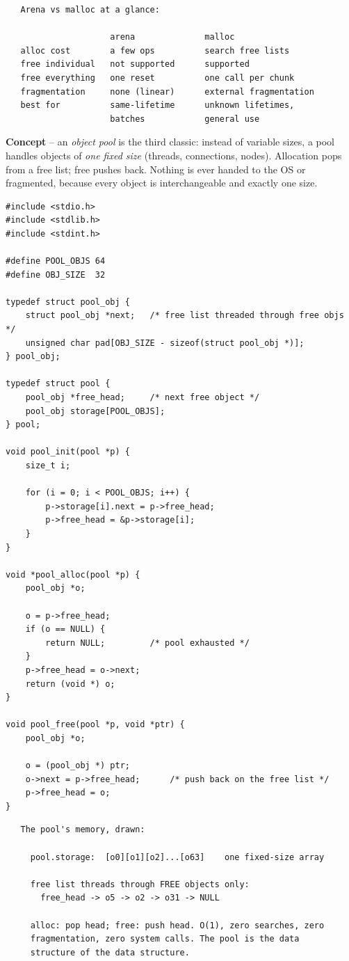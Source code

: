 \begin{verbatim}
   Arena vs malloc at a glance:

                     arena              malloc
   alloc cost        a few ops          search free lists
   free individual   not supported      supported
   free everything   one reset          one call per chunk
   fragmentation     none (linear)      external fragmentation
   best for          same-lifetime      unknown lifetimes,
                     batches            general use
\end{verbatim}

\textbf{Concept} -- an \emph{object pool} is the third classic: instead
of variable sizes, a pool handles objects of \emph{one fixed size}
(threads, connections, nodes). Allocation pops from a free list;
free pushes back. Nothing is ever handed to the OS or fragmented,
because every object is interchangeable and exactly one size.

\begin{lstlisting}[caption={An object pool: fixed-size objects, no fragmentation.}]
#include <stdio.h>
#include <stdlib.h>
#include <stdint.h>

#define POOL_OBJS 64
#define OBJ_SIZE  32

typedef struct pool_obj {
    struct pool_obj *next;   /* free list threaded through free objs */
    unsigned char pad[OBJ_SIZE - sizeof(struct pool_obj *)];
} pool_obj;

typedef struct pool {
    pool_obj *free_head;     /* next free object */
    pool_obj storage[POOL_OBJS];
} pool;

void pool_init(pool *p) {
    size_t i;

    for (i = 0; i < POOL_OBJS; i++) {
        p->storage[i].next = p->free_head;
        p->free_head = &p->storage[i];
    }
}

void *pool_alloc(pool *p) {
    pool_obj *o;

    o = p->free_head;
    if (o == NULL) {
        return NULL;         /* pool exhausted */
    }
    p->free_head = o->next;
    return (void *) o;
}

void pool_free(pool *p, void *ptr) {
    pool_obj *o;

    o = (pool_obj *) ptr;
    o->next = p->free_head;      /* push back on the free list */
    p->free_head = o;
}
\end{lstlisting}

\begin{verbatim}
   The pool's memory, drawn:

     pool.storage:  [o0][o1][o2]...[o63]    one fixed-size array

     free list threads through FREE objects only:
       free_head -> o5 -> o2 -> o31 -> NULL

     alloc: pop head; free: push head. O(1), zero searches, zero
     fragmentation, zero system calls. The pool is the data
     structure of the data structure.
\end{verbatim}

